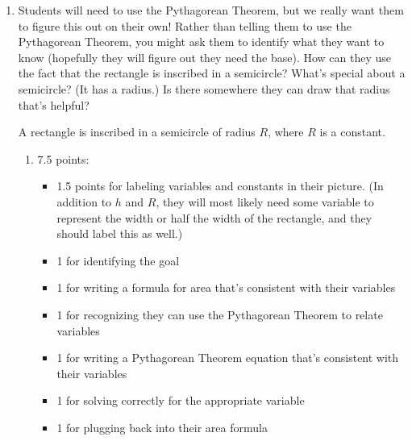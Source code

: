 \documentclass{article}
\begin{document}
\begin{enumerate}[resume]
\begin{enumerate}
  \end{enumerate}

\item \label{gottlieb-1.3.30} %

  \begin{workshop}
    Students will need to use the Pythagorean Theorem, but we really want them to figure this out on their own! Rather than telling them to use the Pythagorean Theorem, you might ask them to identify what they want to know (hopefully they will figure out they need the base). How can they use the fact that the rectangle is inscribed in a semicircle? What's special about a semicircle? (It has a radius.) Is there somewhere they can draw that radius that's helpful?
  \end{workshop}

  A rectangle is inscribed in a semicircle of radius $R$, where $R$ is a constant.


  \begin{enumerate}
  \item \label{gottlieb-1.3.30a}

    \begin{grading}
      7.5 points:
      \begin{itemize}[nosep]
      \item 1.5 points for labeling variables and constants in their picture. (In addition to $h$ and $R$, they will most likely need some variable to represent the width or half the width of the rectangle, and they should label this as well.)
      \item 1 for identifying the goal
      \item 1 for writing a formula for area that's consistent with their variables
      \item 1 for recognizing they can use the Pythagorean Theorem to relate variables
      \item 1 for writing a Pythagorean Theorem equation that's consistent with their variables
      \item 1 for solving correctly for the appropriate variable
      \item 1 for plugging back into their area formula
      \end{itemize}
    \end{grading}


\end{enumerate}
\end{enumerate}
\end{document}
